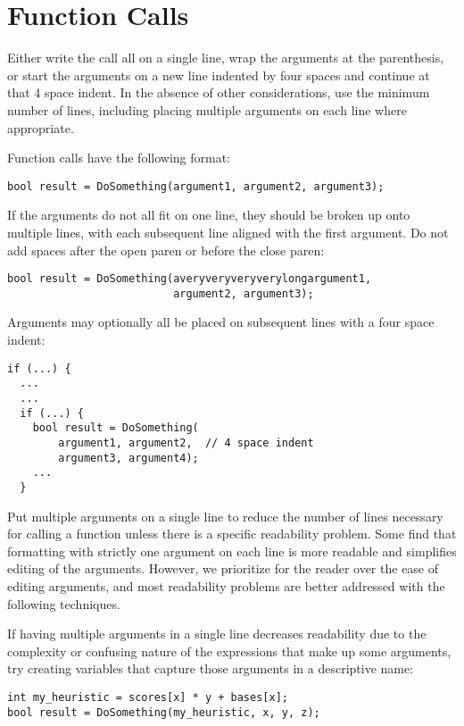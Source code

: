 
\section{Function Calls}\label{sec:function-calls}
Either write the call all on a single line, wrap the arguments at the parenthesis, or start the arguments on a new line indented by four spaces and continue at that 4 space indent. In the absence of other considerations, use the minimum number of lines, including placing multiple arguments on each line where appropriate.

Function calls have the following format:
\begin{verbatim}
bool result = DoSomething(argument1, argument2, argument3);
\end{verbatim}

If the arguments do not all fit on one line, they should be broken up onto multiple lines, with each subsequent line aligned with the first argument. Do not add spaces after the open paren or before the close paren:
\begin{verbatim}
bool result = DoSomething(averyveryveryverylongargument1,
                          argument2, argument3);
\end{verbatim}
Arguments may optionally all be placed on subsequent lines with a four space indent:
\begin{verbatim}
if (...) {
  ...
  ...
  if (...) {
    bool result = DoSomething(
        argument1, argument2,  // 4 space indent
        argument3, argument4);
    ...
  }
\end{verbatim}

Put multiple arguments on a single line to reduce the number of lines necessary for calling a function unless there is a specific readability problem. Some find that formatting with strictly one argument on each line is more readable and simplifies editing of the arguments. However, we prioritize for the reader over the ease of editing arguments, and most readability problems are better addressed with the following techniques.

If having multiple arguments in a single line decreases readability due to the complexity or confusing nature of the expressions that make up some arguments, try creating variables that capture those arguments in a descriptive name:
\begin{verbatim}
int my_heuristic = scores[x] * y + bases[x];
bool result = DoSomething(my_heuristic, x, y, z);
\end{verbatim}


